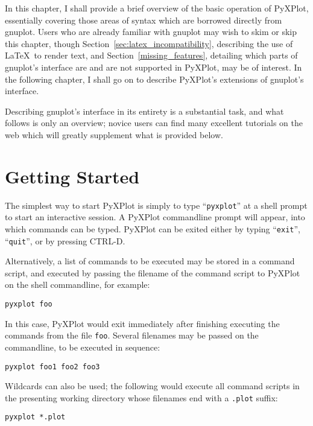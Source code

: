 \documentclass[a4paper,onecolumn,11pt]{book}
\begin{document}
In this chapter, I shall provide a brief overview of the basic operation of
PyXPlot, essentially covering those areas of syntax which are borrowed directly
from gnuplot. Users who are already familiar with gnuplot may wish to skim or
skip this chapter, though Section~\ref{sec:latex_incompatibility}, describing
the use of \LaTeX\ to render text, and Section~\ref{missing_features},
detailing which parts of gnuplot's interface are and are not supported in
PyXPlot, may be of interest. In the following chapter, I shall go on to
describe PyXPlot's extensions of gnuplot's interface.

Describing gnuplot's interface in its entirety is a substantial task, and what
follows is only an overview; novice users can find many excellent tutorials on
the web which will greatly supplement what is provided below.

\section{Getting Started}

The simplest way to start PyXPlot is simply to type ``\texttt{pyxplot}'' at a
shell prompt to start an interactive session. A PyXPlot commandline prompt will
appear, into which commands can be typed. PyXPlot can be exited either by
typing ``\texttt{exit}'', ``\texttt{quit}'', or by pressing CTRL-D.

Alternatively, a list of commands to be executed may be stored in a command
script, and executed by passing the filename of the command script to PyXPlot
on the shell commandline, for example:

\begin{verbatim}
pyxplot foo
\end{verbatim}

\noindent In this case, PyXPlot would exit immediately after finishing
executing the commands from the file \texttt{foo}. Several filenames may be
passed on the commandline, to be executed in sequence:

\begin{verbatim}
pyxplot foo1 foo2 foo3
\end{verbatim}

\noindent Wildcards can also be used; the following would execute all command
scripts in the presenting working directory whose filenames end with a
\texttt{.plot} suffix:

\begin{verbatim}
pyxplot *.plot
\end{verbatim}
\end{document}
